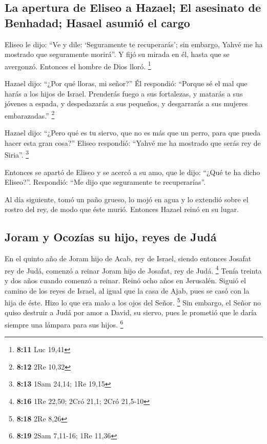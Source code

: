 \begin{paracol}{2}
\hypertarget{la-apertura-de-eliseo-a-hazael-el-asesinato-de-benhadad-hasael-asumiuxf3-el-cargo}{%
\subsection{La apertura de Eliseo a Hazael; El asesinato de Benhadad;
Hasael asumió el
cargo}\label{la-apertura-de-eliseo-a-hazael-el-asesinato-de-benhadad-hasael-asumiuxf3-el-cargo}}

 Eliseo le dijo: ``Ve y dile: `Seguramente te
recuperarás'; sin embargo, Yahvé me ha mostrado que seguramente
morirá''.  Y fijó su mirada en él, hasta que se
avergonzó. Entonces el hombre de Dios lloró. \footnote{\textbf{8:11} Luc
  19,41}

 Hazael dijo: ``¿Por qué lloras, mi señor?'' Él
respondió: ``Porque sé el mal que harás a los hijos de Israel. Prenderás
fuego a sus fortalezas, y matarás a sus jóvenes a espada, y despedazarás
a sus pequeños, y desgarrarás a sus mujeres embarazadas.'' \footnote{\textbf{8:12}
  2Re 10,32}

 Hazael dijo: ``¿Pero qué es tu siervo, que no es más que
un perro, para que pueda hacer esta gran cosa?'' Eliseo respondió:
``Yahvé me ha mostrado que serás rey de Siria''. \footnote{\textbf{8:13}
  1Sam 24,14; 1Re 19,15}

 Entonces se apartó de Eliseo y se acercó a su amo, que
le dijo: ``¿Qué te ha dicho Eliseo?''. Respondió: ``Me dijo que
seguramente te recuperarías''.

 Al día siguiente, tomó un paño grueso, lo mojó en agua y
lo extendió sobre el rostro del rey, de modo que éste murió. Entonces
Hazael reinó en su lugar.

\hypertarget{joram-y-ocozuxedas-su-hijo-reyes-de-juduxe1}{%
\subsection{Joram y Ocozías su hijo, reyes de
Judá}\label{joram-y-ocozuxedas-su-hijo-reyes-de-juduxe1}}

 En el quinto año de Joram hijo de Acab, rey de Israel,
siendo entonces Josafat rey de Judá, comenzó a reinar Joram hijo de
Josafat, rey de Judá. \footnote{\textbf{8:16} 1Re 22,50; 2Cró 21,1; 2Cró
  21,5-10}  Tenía treinta y dos años cuando comenzó a
reinar. Reinó ocho años en Jerusalén.  Siguió el camino
de los reyes de Israel, al igual que la casa de Ajab, pues se casó con
la hija de éste. Hizo lo que era malo a los ojos del Señor. \footnote{\textbf{8:18}
  2Re 8,26}  Sin embargo, el Señor no quiso destruir a
Judá por amor a David, su siervo, pues le prometió que le daría siempre
una lámpara para sus hijos. \footnote{\textbf{8:19} 2Sam 7,11-16; 1Re
  11,36}


\end{paracol}
